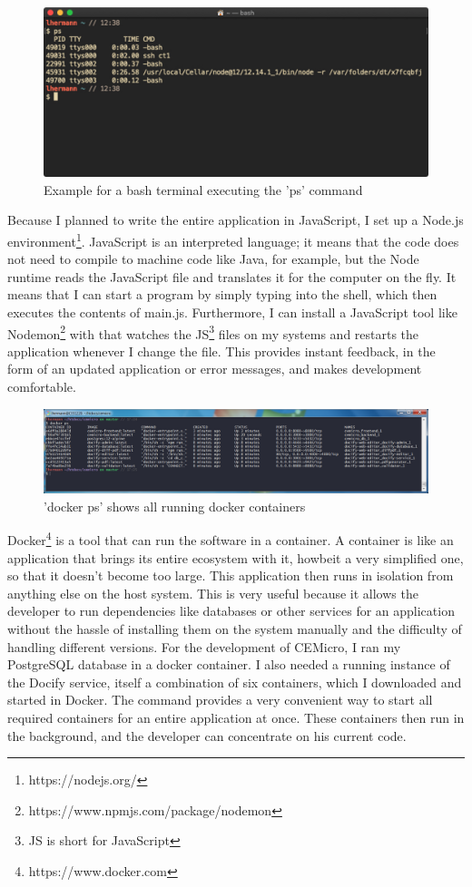 \begin{figure}[ht]
  \centering
  \includegraphics[width=0.75\linewidth]{assets/example-bash-window.jpg}
  \caption{Example for a bash terminal executing the 'ps' command}
\end{figure}

Because I planned to write the entire application in JavaScript, I set up a Node.js environment\footnote{https://nodejs.org/}. JavaScript is an interpreted language; it means that the code does not need to compile to machine code like Java, for example, but the Node runtime reads the JavaScript file and translates it for the computer on the fly. It means that I can start a program by simply typing  into the shell, which then executes the contents of main.js. Furthermore, I can install a JavaScript tool like Nodemon\footnote{https://www.npmjs.com/package/nodemon} with  that watches the JS\footnote{JS is short for JavaScript} files on my systems and restarts the application whenever I change the file. This provides instant feedback, in the form of an updated application or error messages, and makes development comfortable.

\begin{figure}[ht]
  \centering
  \includegraphics[width=1\linewidth]{assets/terminal-docker-ps.png}
  \caption{'docker ps' shows all running docker containers}
\end{figure}

Docker\footnote{https://www.docker.com} is a tool that can run the software in a container. A container is like an application that brings its entire ecosystem with it, howbeit a very simplified one, so that it doesn't become too large. This application then runs in isolation from anything else on the host system. This is very useful because it allows the developer to run dependencies like databases or other services for an application without the hassle of installing them on the system manually and the difficulty of handling different versions. For the development of CEMicro, I ran my PostgreSQL database in a docker container. I also needed a running instance of the Docify service, itself a combination of six containers, which I downloaded and started in Docker. The  command provides a very convenient way to start all required containers for an entire application at once. These containers then run in the background, and the developer can concentrate on his current code.


